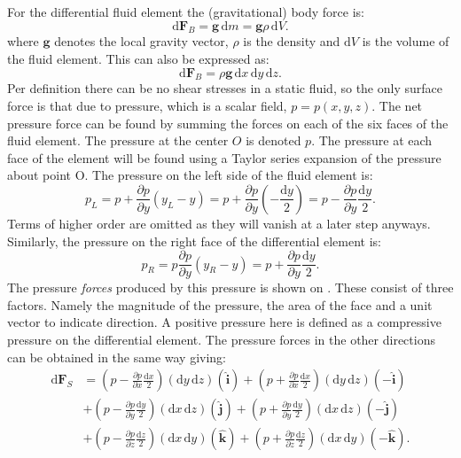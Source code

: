 For the differential fluid element the (gravitational) body force is:
\[ 
  \mathrm{d}\textbf{F}_B = \textbf{g} \, \mathrm{d}m = \textbf{g} \rho \, \mathrm{d}V
.\]
where $\textbf{g}$ denotes the local gravity vector, $\rho$ is the density and $\mathrm{d}V$ is the volume of the fluid element. This can also be expressed as:
\[ 
\mathrm{d} \textbf{F}_B = \rho \textbf{g} \, \mathrm{d}x \, \mathrm{d}y \, \mathrm{d}z
.\]
Per definition there can be no shear stresses in a static fluid, so the only surface force is that due to pressure, which is a scalar field, $p = p(x,y,z)$. The net pressure force can be found by summing the forces on each of the six faces of the fluid element. The pressure at the center $O$ is denoted $p$. The pressure at each face of the element will be found using a Taylor series expansion of the pressure about point O. The pressure on the left side of the fluid element is:
\[ 
p_L = p + \frac{\partial p}{\partial y} \left( y_L - y \right) = p + \frac{\partial p}{\partial y} \left( - \frac{\mathrm{d}y}{2} \right) = p - \frac{\partial p}{\partial y} \frac{\mathrm{d}y}{2}
.\]
Terms of higher order are omitted as they will vanish at a later step anyways. Similarly, the pressure on the right face of the differential element is:
\[ 
p_R = p \frac{\partial p}{\partial y} \left( y_R - y \right) = p + \frac{\partial p}{\partial y} \frac{\mathrm{d}y}{2}
.\]
The pressure \textit{forces} produced by this pressure is shown on . These consist of three factors. Namely the magnitude of the pressure, the area of the face and a unit vector to indicate direction. A positive pressure here is defined as a compressive pressure on the differential element. The pressure forces in the other directions can be obtained in the same way giving:
\begin{align*}
  \mathrm{d}\textbf{F}_S &= \left( p - \frac{\partial p}{\partial x} \frac{\mathrm{d}x}{2} \right) \left( \mathrm{d}y \, \mathrm{d}z \right) \left( \hat{\textbf{i}} \right) + \left( p + \frac{\partial p}{\partial x} \frac{\mathrm{d}x}{2} \right) \left( \mathrm{d}y \, \mathrm{d}z \right) \left( - \hat{\textbf{i}} \right) \\
                         &+ \left( p - \frac{\partial p}{\partial y} \frac{\mathrm{d}y}{2} \right) \left(\mathrm{d}x \, \mathrm{d}z \right) \left( \hat{\textbf{j}} \right) + \left( p + \frac{\partial p}{\partial y} \frac{\mathrm{d}y}{2} \right) \left( \mathrm{d}x \, \mathrm{d}z \right) \left( - \hat{\textbf{j}} \right) \\
                         &+ \left( p - \frac{\partial p}{\partial z} \frac{\mathrm{d}z}{2} \right) \left( \mathrm{d}x \, \mathrm{d}y  \right) \left( \hat{\textbf{k}} \right) + \left( p + \frac{\partial p}{\partial z} \frac{\mathrm{d}z}{2} \right) \left( \mathrm{d}x \, \mathrm{d}y  \right) \left( - \hat{\textbf{k}} \right)
.\end{align*}

